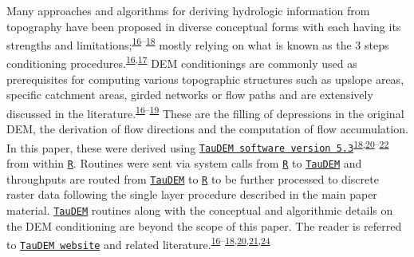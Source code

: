 \documentclass[12pt,oneside]{article}
\begin{document}
Many approaches and algorithms for deriving hydrologic information from topography have been proposed in diverse conceptual forms with each having its strengths and limitations;\textsuperscript{\protect\hyperlink{ref-Arge_et_al_2003}{16}--\protect\hyperlink{ref-Tarboton_1997}{18}} mostly relying on what is known as the 3 steps conditioning procedures.\textsuperscript{\protect\hyperlink{ref-Arge_et_al_2003}{16},\protect\hyperlink{ref-Jenson_and_Domingue_1988}{17}} DEM conditionings are commonly used as prerequisites for computing various topographic structures such as upslope areas, specific catchment areas, girded networks or flow paths and are extensively discussed in the literature.\textsuperscript{\protect\hyperlink{ref-Arge_et_al_2003}{16}--\protect\hyperlink{ref-OCallaghan_Mark_1984}{19}} These are the filling of depressions in the original DEM, the derivation of flow directions and the computation of flow accumulation. In this paper, these were derived using \href{http://hydrology.usu.edu/taudem/taudem5/}{\texttt{TauDEM\ software\ version\ 5.3}}\textsuperscript{\protect\hyperlink{ref-Tarboton_1997}{18},\protect\hyperlink{ref-Tarboton_et_al_1991}{20}--\protect\hyperlink{ref-Yang_et_al_2006}{22}} from within \href{https://cran.r-project.org/}{\texttt{R}}. Routines were sent via system calls from \href{https://cran.r-project.org/}{\texttt{R}} to \href{http://hydrology.usu.edu/taudem/taudem5/}{\texttt{TauDEM}} and throughputs are routed from \href{http://hydrology.usu.edu/taudem/taudem5/}{\texttt{TauDEM}} to \href{https://cran.r-project.org/}{\texttt{R}} to be further processed to discrete raster data following the single layer procedure described in the main paper material. \href{http://hydrology.usu.edu/taudem/taudem5/}{\texttt{TauDEM}} routines along with the conceptual and algorithmic details on the DEM conditioning are beyond the scope of this paper. The reader is referred to \href{http://hydrology.usu.edu/taudem/taudem5/documentation.html}{\texttt{TauDEM\ website}} and related literature.\textsuperscript{\protect\hyperlink{ref-Arge_et_al_2003}{16}--\protect\hyperlink{ref-Tarboton_1997}{18},\protect\hyperlink{ref-Tarboton_et_al_1991}{20},\protect\hyperlink{ref-Tesfa_et_al_2011}{21},\protect\hyperlink{ref-Wallis_et_al_2009}{24}}
\end{document}
